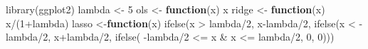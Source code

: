 \documentclass[
]{article}
\newenvironment{Shaded}{\begin{snugshade}}{\end{snugshade}}
\newcommand{\ControlFlowTok}[1]{\textcolor[rgb]{0.13,0.29,0.53}{\textbf{#1}}}
\newcommand{\DecValTok}[1]{\textcolor[rgb]{0.00,0.00,0.81}{#1}}
\newcommand{\FunctionTok}[1]{\textcolor[rgb]{0.00,0.00,0.00}{#1}}
\newcommand{\NormalTok}[1]{#1}
\newcommand{\OtherTok}[1]{\textcolor[rgb]{0.56,0.35,0.01}{#1}}
\newcommand{\SpecialCharTok}[1]{\textcolor[rgb]{0.00,0.00,0.00}{#1}}
\begin{document}
\begin{Shaded}
\begin{Highlighting}[]
\FunctionTok{library}\NormalTok{(ggplot2)}
\NormalTok{lambda }\OtherTok{\textless{}{-}} \DecValTok{5}
\NormalTok{ols }\OtherTok{\textless{}{-}} \ControlFlowTok{function}\NormalTok{(x) x}
\NormalTok{ridge }\OtherTok{\textless{}{-}} \ControlFlowTok{function}\NormalTok{(x) x}\SpecialCharTok{/}\NormalTok{(}\DecValTok{1}\SpecialCharTok{+}\NormalTok{lambda)}
\NormalTok{lasso }\OtherTok{\textless{}{-}}\ControlFlowTok{function}\NormalTok{(x) }\FunctionTok{ifelse}\NormalTok{(x }\SpecialCharTok{\textgreater{}}\NormalTok{ lambda}\SpecialCharTok{/}\DecValTok{2}\NormalTok{, x}\SpecialCharTok{{-}}\NormalTok{lambda}\SpecialCharTok{/}\DecValTok{2}\NormalTok{,}
   \FunctionTok{ifelse}\NormalTok{(x }\SpecialCharTok{\textless{}} \SpecialCharTok{{-}}\NormalTok{lambda}\SpecialCharTok{/}\DecValTok{2}\NormalTok{, x}\SpecialCharTok{+}\NormalTok{lambda}\SpecialCharTok{/}\DecValTok{2}\NormalTok{, }
   \FunctionTok{ifelse}\NormalTok{( }\SpecialCharTok{{-}}\NormalTok{lambda}\SpecialCharTok{/}\DecValTok{2} \SpecialCharTok{\textless{}=}\NormalTok{ x }\SpecialCharTok{\&}\NormalTok{ x }\SpecialCharTok{\textless{}=}\NormalTok{ lambda}\SpecialCharTok{/}\DecValTok{2}\NormalTok{, }\DecValTok{0}\NormalTok{, }\DecValTok{0}\NormalTok{)))}



\end{Highlighting}
\end{Shaded}
\end{document}
